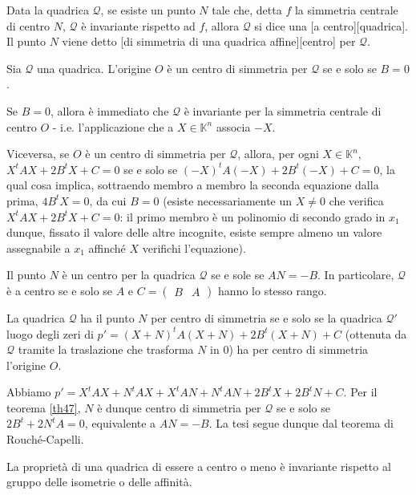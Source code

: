 \begin{Definition}\label{def42}
	Data la quadrica $\mathcal{Q}$, se esiste un punto $N$ tale che, detta $f$ la simmetria centrale di centro $N$, $\mathcal{Q}$ \`e invariante rispetto ad $f$, allora $\mathcal{Q}$ si dice una [a centro][quadrica]. Il punto $N$ viene detto [di simmetria di una quadrica affine][centro] per $\mathcal{Q}$.
\end{Definition}
\begin{Theorem}\label{th47}
	Sia $\mathcal{Q}$ una quadrica. L'origine $O$ \`e un centro di simmetria per $\mathcal{Q}$ se e solo se $B = 0$.
\end{Theorem}
\Proof Se $B = 0$, allora \`e immediato che $\mathcal{Q}$ \`e invariante per la simmetria centrale di centro $O$ - i.e. l'applicazione che a $X \in \mathbb{K}^n$ associa $-X$.
	\par Viceversa, se $O$ \`e un centro di simmetria per $\mathcal{Q}$, allora, per ogni $X \in \mathbb{K}^n$, $X^tAX + 2 B^t X + C = 0$ se e solo se $(-X)^tA(-X) + 2 B^t (-X) + C = 0$, la qual cosa implica, sottraendo membro a membro la seconda equazione dalla prima, $4 B^t X = 0$, da cui $B = 0$ (esiste necessariamente un $X \neq 0$ che verifica $X^tAX + 2B^tX + C = 0$: il primo membro è un polinomio di secondo grado in $x_1$ dunque, fissato il valore delle altre incognite, esiste sempre almeno un valore assegnabile a $x_1$ affinch\'e $X$ verifichi l'equazione). \EndProof
\begin{Theorem}\label{th48}
	Il punto $N$ \`e un centro per la quadrica $\mathcal{Q}$ se e sole se $AN = -B$. In particolare, $\mathcal{Q}$ \`e a centro se e solo se $A$ e $C = \left ( \begin{array}{c|c} B & A \end{array} \right )$ hanno lo stesso rango.
\end{Theorem}
\Proof La quadrica $\mathcal{Q}$ ha il punto $N$ per centro di simmetria se e solo se la quadrica $\mathcal{Q}'$ luogo degli zeri di $p' = (X + N)^tA(X + N) + 2 B^t(X + N) + C$ (ottenuta da $\mathcal{Q}$ tramite la traslazione che trasforma $N$ in $0$) ha per centro di simmetria l'origine $O$.
	\par Abbiamo $p' = X^tAX + N^tAX + X^tAN + N^tAN + 2B^tX + 2B^tN + C$. Per il teorema \ref{th47}, $N$ \`e dunque centro di simmetria per $\mathcal{Q}$ se e solo se $2B^t + 2N^tA = 0$, equivalente a $AN = -B$. La tesi segue dunque dal teorema di Rouch\'e-Capelli. \EndProof
\begin{Corollary}\label{cor5}
	La propriet\`a di una quadrica di essere a centro o meno \`e invariante rispetto al gruppo delle isometrie o delle affinit\`a.
\end{Corollary}
